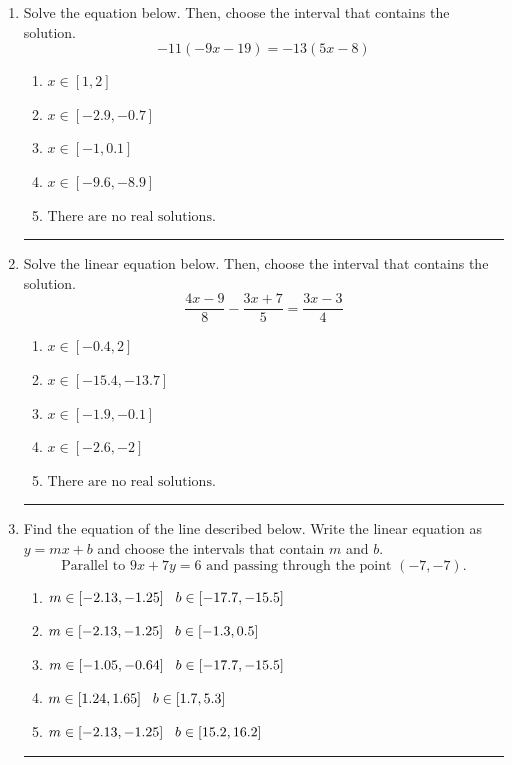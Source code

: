\documentclass[14pt]{extbook}
\newcommand{\litem}[1]{\item#1\hspace*{-1cm}\rule{\textwidth}{0.4pt}}
\begin{document}
\begin{enumerate}
\litem{
Solve the equation below. Then, choose the interval that contains the solution.\[ -11(-9x -19) = -13(5x -8) \]\begin{enumerate}[label=\Alph*.]
\item \( x \in [1, 2] \)
\item \( x \in [-2.9, -0.7] \)
\item \( x \in [-1, 0.1] \)
\item \( x \in [-9.6, -8.9] \)
\item \( \text{There are no real solutions.} \)

\end{enumerate} }
\litem{
Solve the linear equation below. Then, choose the interval that contains the solution.\[ \frac{4x -9}{8} - \frac{3x + 7}{5} = \frac{3x -3}{4} \]\begin{enumerate}[label=\Alph*.]
\item \( x \in [-0.4, 2] \)
\item \( x \in [-15.4, -13.7] \)
\item \( x \in [-1.9, -0.1] \)
\item \( x \in [-2.6, -2] \)
\item \( \text{There are no real solutions.} \)

\end{enumerate} }
\litem{
Find the equation of the line described below. Write the linear equation as $ y=mx+b $ and choose the intervals that contain $m$ and $b$.\[ \text{Parallel to } 9 x + 7 y = 6 \text{ and passing through the point } (-7, -7). \]\begin{enumerate}[label=\Alph*.]
\item \( m \in [-2.13, -1.25] \hspace*{3mm} b \in [-17.7, -15.5] \)
\item \( m \in [-2.13, -1.25] \hspace*{3mm} b \in [-1.3, 0.5] \)
\item \( m \in [-1.05, -0.64] \hspace*{3mm} b \in [-17.7, -15.5] \)
\item \( m \in [1.24, 1.65] \hspace*{3mm} b \in [1.7, 5.3] \)
\item \( m \in [-2.13, -1.25] \hspace*{3mm} b \in [15.2, 16.2] \)


\end{enumerate}}
\end{enumerate}
\end{document}
